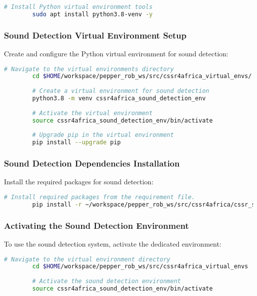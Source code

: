 \documentclass{CSSRforAfrica}
\begin{document}
{\begin{lstlisting}[style=withoutNumbering, language=bash]
		# Install Python virtual environment tools
		sudo apt install python3.8-venv -y
		\end{lstlisting}
		
		\subsubsection*{Sound Detection Virtual Environment Setup}
		Create and configure the Python virtual environment for sound detection:
		\begin{lstlisting}[style=withoutNumbering, language=bash]
		# Navigate to the virtual environments directory
		cd $HOME/workspace/pepper_rob_ws/src/cssr4africa_virtual_envs/
		
		# Create a virtual environment for sound detection
		python3.8 -m venv cssr4africa_sound_detection_env
		
		# Activate the virtual environment
		source cssr4africa_sound_detection_env/bin/activate
		
		# Upgrade pip in the virtual environment
		pip install --upgrade pip
		\end{lstlisting}
		
		\subsubsection*{Sound Detection Dependencies Installation}
		Install the required packages for sound detection:
		\begin{lstlisting}[style=withoutNumbering, language=bash]
		# Install required packages from the requirement file.
		pip install -r ~/workspace/pepper_rob_ws/src/cssr4africa/cssr_system/sound_detection/sound_detection_requirements.txt
		\end{lstlisting}
		
		\subsubsection*{Activating the Sound Detection Environment}
		To use the sound detection system, activate the dedicated environment:
		\begin{lstlisting}[style=withoutNumbering, language=bash]
		# Navigate to the virtual environment directory
		cd $HOME/workspace/pepper_rob_ws/src/cssr4africa_virtual_envs
		
		# Activate the sound detection environment
		source cssr4africa_sound_detection_env/bin/activate
		\end{lstlisting}
		
}
\end{document}
